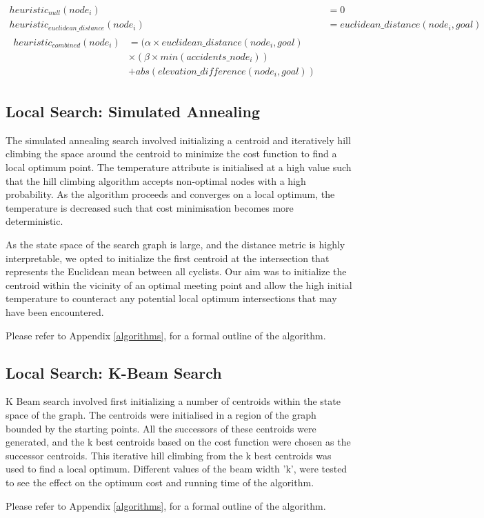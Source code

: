 \documentclass[11pt]{article}
\begin{document}
\begin{align}\label{heuristic_fns}
heuristic_{null}(node_i) &= 0 \\
heuristic_{euclidean\_distance}(node_i) &= euclidean\_distance(node_i, goal)\\
\begin{split}
heuristic_{combined}(node_i) &= (\alpha \times euclidean\_distance(node_i, goal) \\ &\times  (\beta \times min(accidents\_node_i)) \\&+ abs(elevation\_difference(node_i, goal))
\end{split}
\end{align}

\subsection{Local Search: Simulated Annealing}
The simulated annealing search involved initializing a centroid and iteratively hill climbing the space around the centroid to minimize the cost function to find a local optimum point. The temperature attribute is initialised at a high value such that the hill climbing algorithm accepts non-optimal nodes with a high probability. As the algorithm proceeds and converges on a local optimum, the temperature is decreased such that cost minimisation becomes more deterministic.
\par
As the state space of the search graph is large, and the distance metric is highly interpretable, we opted to initialize the first centroid at the intersection that represents the Euclidean mean between all cyclists. Our aim was to initialize the centroid within the vicinity of an optimal meeting point and allow the high initial temperature to counteract any potential local optimum intersections that may have been encountered.
\par
Please refer to Appendix \ref{algorithms},  for a formal outline of the algorithm.

\subsection{Local Search: K-Beam Search}

K Beam search involved first initializing a number of centroids within the state space of the graph. The centroids were initialised in a region of the graph bounded by the starting points.  All the successors of these centroids were generated, and the k best centroids based on the cost function were chosen as the successor centroids. This iterative hill climbing from the k best centroids was used to find a local optimum. Different values of the beam width 'k', were tested to see the effect on the optimum cost and running time of the algorithm.
\par
Please refer to Appendix \ref{algorithms},  for a formal outline of the algorithm.
\end{document}
